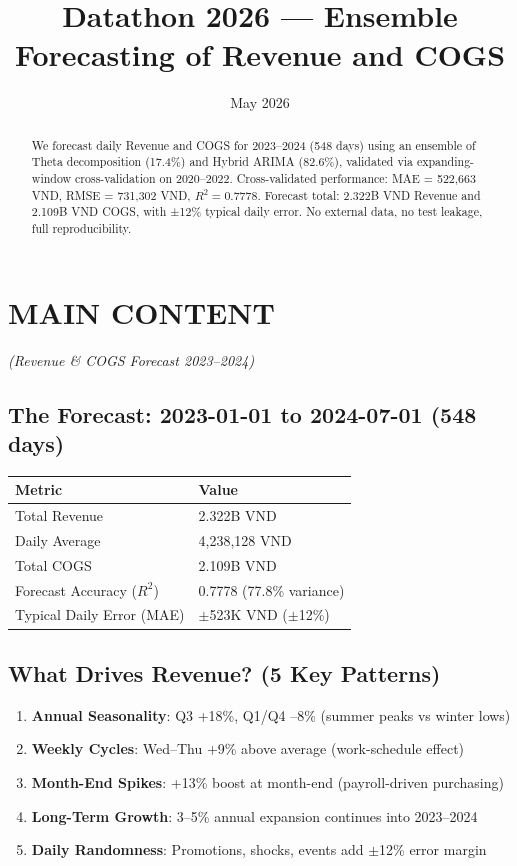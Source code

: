 \documentclass[12pt,a4paper]{article}
\title{\textbf{Datathon 2026 --- Ensemble Forecasting of Revenue and COGS}}
\author{}
\date{May 2026}
\begin{document}
\maketitle

\begin{abstract}
We forecast daily Revenue and COGS for 2023--2024 (548 days) using an ensemble of Theta decomposition (17.4\%) and Hybrid ARIMA (82.6\%), validated via expanding-window cross-validation on 2020--2022. Cross-validated performance: MAE = 522,663 VND, RMSE = 731,302 VND, $R^2 = 0.7778$. Forecast total: 2.322B VND Revenue and 2.109B VND COGS, with ±12\% typical daily error. No external data, no test leakage, full reproducibility.
\end{abstract}

\section*{\Large \textbf{MAIN CONTENT}}
\textit{(Revenue \& COGS Forecast 2023--2024)}

\subsection*{The Forecast: 2023-01-01 to 2024-07-01 (548 days)}

\begin{table}[h!]
\centering
\begin{tabular}{ll}
\toprule
\textbf{Metric} & \textbf{Value} \\
\midrule
Total Revenue & 2.322B VND \\
Daily Average & 4,238,128 VND \\
Total COGS & 2.109B VND \\
Forecast Accuracy ($R^2$) & 0.7778 (77.8\% variance) \\
Typical Daily Error (MAE) & $\pm$523K VND ($\pm$12\%) \\
\bottomrule
\end{tabular}
\end{table}

\subsection*{What Drives Revenue? (5 Key Patterns)}

\begin{enumerate}
  \item \textbf{Annual Seasonality}: Q3 +18\%, Q1/Q4 --8\% (summer peaks vs winter lows)
  \item \textbf{Weekly Cycles}: Wed--Thu +9\% above average (work-schedule effect)
  \item \textbf{Month-End Spikes}: +13\% boost at month-end (payroll-driven purchasing)
  \item \textbf{Long-Term Growth}: 3--5\% annual expansion continues into 2023--2024
  \item \textbf{Daily Randomness}: Promotions, shocks, events add $\pm$12\% error margin
\end{enumerate}
\end{document}
